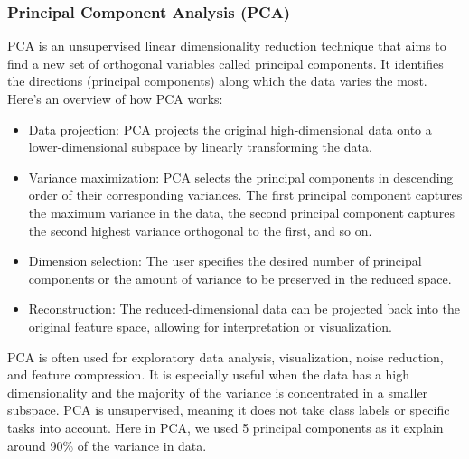 \documentclass{article}
\begin{document}
\subsubsection{Principal Component Analysis (PCA)}
PCA is an unsupervised linear dimensionality reduction technique that aims to find a new set of orthogonal variables called principal components. It identifies the directions (principal components) along which the data varies the most. Here's an overview of how PCA works:
\begin{itemize}
    \item Data projection: PCA projects the original high-dimensional data onto a lower-dimensional subspace by linearly transforming the data.
    \item Variance maximization: PCA selects the principal components in descending order of their corresponding variances. The first principal component captures the maximum variance in the data, the second principal component captures the second highest variance orthogonal to the first, and so on.
    \item Dimension selection: The user specifies the desired number of principal components or the amount of variance to be preserved in the reduced space.
    \item Reconstruction: The reduced-dimensional data can be projected back into the original feature space, allowing for interpretation or visualization.
\end{itemize}
PCA is often used for exploratory data analysis, visualization, noise reduction, and feature compression. It is especially useful when the data has a high dimensionality and the majority of the variance is concentrated in a smaller subspace. PCA is unsupervised, meaning it does not take class labels or specific tasks into account.
Here in PCA, we used 5 principal components as it explain around 90\% of the variance in data.
\end{document}
